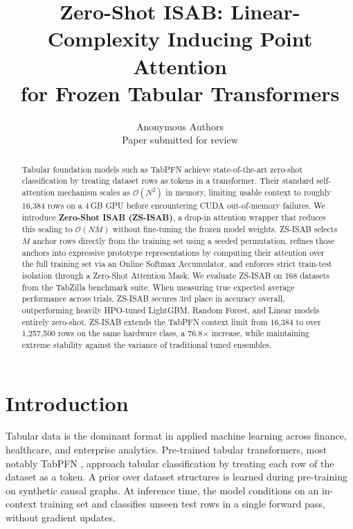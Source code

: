 \documentclass{article}
\title{Zero-Shot ISAB: Linear-Complexity Inducing Point Attention\\for Frozen Tabular Transformers}
\author{\name Anonymous Authors \\
      \addr Paper submitted for review}
\begin{document}
\maketitle

\begin{abstract}
Tabular foundation models such as TabPFN achieve state-of-the-art zero-shot classification by treating dataset rows as tokens in a transformer. Their standard self-attention mechanism scales as $\mathcal{O}(N^2)$ in memory, limiting usable context to roughly 16{,}384 rows on a 4\,GB GPU before encountering CUDA out-of-memory failures. We introduce \textbf{Zero-Shot ISAB (ZS-ISAB)}, a drop-in attention wrapper that reduces this scaling to $\mathcal{O}(NM)$ without fine-tuning the frozen model weights. ZS-ISAB selects $M$ anchor rows directly from the training set using a seeded permutation, refines those anchors into expressive prototype representations by computing their attention over the full training set via an Online Softmax Accumulator, and enforces strict train-test isolation through a Zero-Shot Attention Mask. We evaluate ZS-ISAB on 168 datasets from the TabZilla benchmark suite. When measuring true expected average performance across trials, ZS-ISAB secures 3rd place in accuracy overall, outperforming heavily HPO-tuned LightGBM, Random Forest, and Linear models entirely zero-shot. ZS-ISAB extends the TabPFN context limit from 16{,}384 to over 1{,}257{,}500 rows on the same hardware class, a 76.8$\times$ increase, while maintaining extreme stability against the variance of traditional tuned ensembles.
\end{abstract}

\section{Introduction}

Tabular data is the dominant format in applied machine learning across finance, healthcare, and enterprise analytics. Pre-trained tabular transformers, most notably TabPFN \citep{hollmann2022tabpfn}, approach tabular classification by treating each row of the dataset as a token. A prior over dataset structures is learned during pre-training on synthetic causal graphs. At inference time, the model conditions on an in-context training set and classifies unseen test rows in a single forward pass, without gradient updates.
\end{document}

